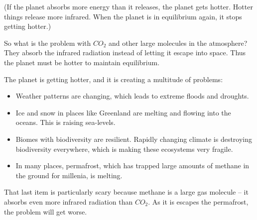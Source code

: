 (If the planet absorbs more energy than it releases, the planet gets
hotter.  Hotter things release more infrared. When the planet is in
equilibrium again, it stops getting hotter.)

So what is the problem with $CO_2$ and other large molecules in the
atmosphere? They absorb the infrared radiation instead of letting it
escape into space. Thus the planet must be hotter to maintain
equilibrium.

The planet is getting hotter, and it is creating a multitude of
problems:
\begin{itemize}
\item Weather patterns are changing, which leads to extreme floods and
  droughts.
  
\item Ice and snow in places like Greenland are melting and flowing
  into the oceans. This is raising sea-levels.
  
\item Biomes with biodiversity are resilient. Rapidly changing climate
  is destroying biodiversity everywhere, which is making these ecosystems
  very fragile.
  
\item In many places, permafrost, which has trapped large amounts of
  methane in the ground for millenia, is melting.
\end{itemize}

That last item is particularly scary because methane is a large gas
molecule -- it absorbs even more infrared radiation than $CO_2$. As it is
escapes the permafrost, the problem will get worse.


